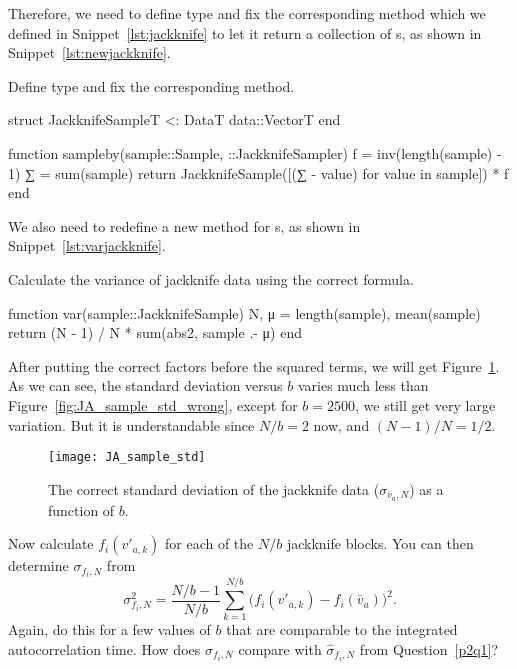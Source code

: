 Therefore, we need to define type  and fix the corresponding
 method which we defined in Snippet~\ref{lst:jackknife} to let it return
a collection of s,
as shown in Snippet~\ref{lst:newjackknife}.
%
\begin{algorithm}
    \caption{Define type  and fix the corresponding
         method.}
    \label{lst:newjackknife}
    \begin{juliacode}
        struct JackknifeSample{T} <: Data{T}
            data::Vector{T}
        end

        function sampleby(sample::Sample, ::JackknifeSampler)
            f = inv(length(sample) - 1)
            ∑ = sum(sample)
            return JackknifeSample([(∑ - value) for value in sample]) * f
        end
    \end{juliacode}
\end{algorithm}
%
We also need to redefine a new  method for s,
as shown in Snippet~\ref{lst:varjackknife}.
%
\begin{algorithm}
    \caption{Calculate the variance of jackknife data using the correct formula.}
    \label{lst:varjackknife}
    \begin{juliacode}
        function var(sample::JackknifeSample)
            N, μ = length(sample), mean(sample)
            return (N - 1) / N * sum(abs2, sample .- μ)
        end
    \end{juliacode}
\end{algorithm}

After putting the correct factors before the squared terms, we will get
Figure~\ref{fig:JA_sample_std}.
As we can see, the standard deviation versus \(b\) varies much less than
Figure~\ref{fig:JA_sample_std_wrong}, except for \(b = 2500\), we still get very large
variation. But it is understandable since \(N/b = 2\) now, and \((N - 1) / N = 1/2\).
%
\begin{figure}[H]
    \centering
    \texttt{[image: JA\_sample\_std]}
    \caption{The correct standard deviation of the jackknife data (\(\sigma_{\bar{v}_a,N}\)) as a
        function of \(b\).}
    \label{fig:JA_sample_std}
\end{figure}


\Question{} Now calculate \(f_i(v'_{a,k})\) for each of the \(N/b\) jackknife blocks.
You can then determine \(\sigma_{f_i,N}\) from
%
\begin{equation}
    \sigma^2_{f_i,N} = \frac{ N/b - 1 }{ N/b }
    \sum_{k=1}^{N/b} \bigl( f_i(v'_{a,k}) - f_i(\bar{v}_a) \bigr)^2.
\end{equation}
%
Again, do this for a few values of \(b\) that are comparable to the integrated
autocorrelation time. How does \(\sigma_{f_i,N}\) compare with \(\hat{\sigma}_{f_i,N}\) from
Question~\ref{p2q1}?

\Answer{}

